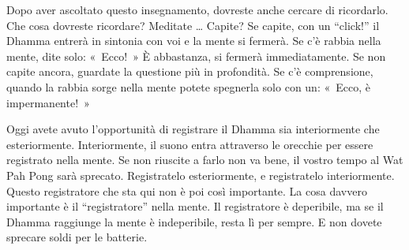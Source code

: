 Dopo aver ascoltato questo insegnamento, dovreste anche cercare di
ricordarlo. Che cosa dovreste ricordare? Meditate \ldots{} Capite? Se capite,
con un ``click!'' il Dhamma entrerà in sintonia con voi e la mente si
fermerà. Se c'è rabbia nella mente, dite solo: «~Ecco!~» È abbastanza,
si fermerà immediatamente. Se non capite ancora, guardate la questione
più in profondità. Se c'è comprensione, quando la rabbia sorge nella
mente potete spegnerla solo con un: «~Ecco, è impermanente!~»

Oggi avete avuto l'opportunità di registrare il Dhamma sia interiormente
che esteriormente. Interiormente, il suono entra attraverso le orecchie
per essere registrato nella mente. Se non riuscite a farlo non va bene,
il vostro tempo al Wat Pah Pong sarà sprecato. Registratelo
esteriormente, e registratelo interiormente. Questo registratore che sta
qui non è poi così importante. La cosa davvero importante è il
``registratore'' nella mente. Il registratore è deperibile, ma se il
Dhamma raggiunge la mente è indeperibile, resta lì per sempre. E non
dovete sprecare soldi per le batterie.

